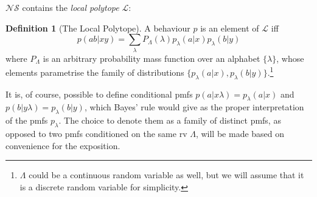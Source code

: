 \documentclass[10pt, a4paper]{article}
\numberwithin{equation}{section} %
\newcounter{stmt} %
\theoremstyle{definition}
\newtheorem{defn}[stmt]{Definition}
\theoremstyle{plain}
\newcommand{\?}{\mathrel{?}} %
\newcommand{\Ls}{\mathcal{L}}
\newcommand{\NSs}{\mathcal{NS}}
\begin{document}
    \(\NSs\) contains the \emph{local polytope} \(\Ls\):
    \begin{defn}[The Local Polytope]
      A behaviour \(p\) is an element of \(\Ls\) iff
      \begin{equation}\label{eqn:localdef}
        p(ab|xy) = \sum_{\lambda} P_{\Lambda}({\lambda}) p_{{\lambda}}(a|x)p_{{\lambda}}(b|y)
      \end{equation}
      where \(P_{\Lambda}\) is an arbitrary probability mass function over an alphabet \(\{\lambda\}\), whose elements parametrise the family of distributions \(\{p_{\lambda}(a|x), p_{\lambda}(b|y)\}\).\footnote{\(\Lambda\) could be a continuous random variable as well, but we will assume that it is a discrete random variable for simplicity.}
    \end{defn}
    It is, of course, possible to define conditional pmfs \(p(a|x\lambda) = p_{\lambda}(a|x)\) and \(p(b|y\lambda) = p_{\lambda}(b|y)\), which Bayes' rule would give as the proper interpretation of the pmfs \(p_{\lambda}\). The choice to denote them as a family of distinct pmfs, as opposed to two pmfs conditioned on the same rv \(\Lambda\), will be made based on convenience for the exposition.
\end{document}
